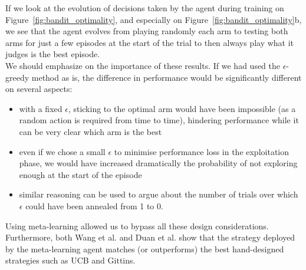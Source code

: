 If we look at the evolution of decisions taken by the agent during training
on Figure~\ref{fig:bandit_optimality}, and especially on
Figure~\ref{fig:bandit_optimality}b, we see that the agent evolves from playing
randomly each arm to testing both arms for just a few episodes at the start
of the trial to then always play what it judges is the best episode.\\

We should emphasize on the importance of these results. If we had used the 
$\epsilon$-greedy method as is, the difference in performance would be 
significantly different on several aspects:
\begin{itemize}
	\item with a fixed $\epsilon$, sticking to the optimal arm would have
		been impossible (as a random action is required from time to 
		time), hindering performance while it can be very clear
		which arm is the best
	\item even if we chose a small $\epsilon$ to minimise performance loss
		in the exploitation phase, we would have increased dramatically
		the probability of not exploring enough at the start of the 
		episode
	\item similar reasoning can be used to argue about the number of 
		trials over which $\epsilon$ could have been annealed from
		1 to 0.
\end{itemize}
Using meta-learning allowed us to bypass all these design considerations.
Furthermore, both Wang et al. \cite{learningtorl} and Duan et al. 
\cite{fastrlviaslowrl} show that the strategy deployed by the meta-learning
agent matches (or outperforms) the best hand-designed strategies such as 
UCB and Gittins.\\

